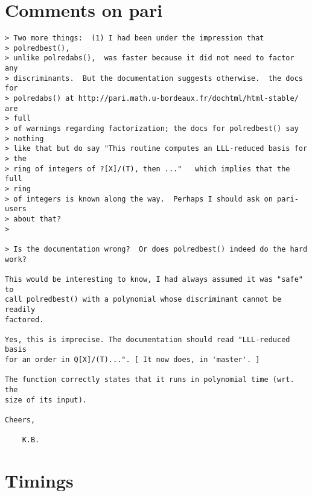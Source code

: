 \documentclass[11pt]{amsart}
\numberwithin{equation}{subsection}
\theoremstyle{definition}
\begin{document}
\section{Comments on pari}

\begin{verbatim}
> Two more things:  (1) I had been under the impression that 
> polredbest(),
> unlike polredabs(),  was faster because it did not need to factor any
> discriminants.  But the documentation suggests otherwise.  the docs for
> polredabs() at http://pari.math.u-bordeaux.fr/dochtml/html-stable/ are 
> full
> of warnings regarding factorization; the docs for polredbest() say 
> nothing
> like that but do say "This routine computes an LLL-reduced basis for 
> the
> ring of integers of ?[X]/(T), then ..."   which implies that the full 
> ring
> of integers is known along the way.  Perhaps I should ask on pari-users
> about that?
> 

> Is the documentation wrong?  Or does polredbest() indeed do the hard work?

This would be interesting to know, I had always assumed it was "safe" to
call polredbest() with a polynomial whose discriminant cannot be readily
factored.

Yes, this is imprecise. The documentation should read "LLL-reduced basis
for an order in Q[X]/(T)...". [ It now does, in 'master'. ]

The function correctly states that it runs in polynomial time (wrt. the
size of its input).

Cheers,

    K.B.
\end{verbatim}

\section{Timings}
\end{document}
